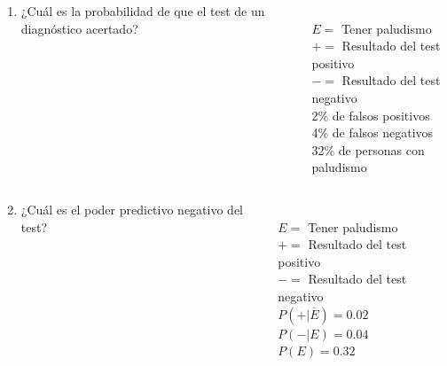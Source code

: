 \documentclass[aspectratio=149,10pt,xcolor=dvipsnames,t]{beamer}
\begin{document}
\begin{frame}
\begin{columns}
\begin{column}[T]{0.6\textwidth}
\begin{enumerate}
\item ¿Cuál es la probabilidad de que el test de un diagnóstico acertado?
\end{enumerate}
\end{column}
\begin{column}[T]{0.4\textwidth}
\\
$E=$ Tener paludismo\\
$+=$ Resultado del test positivo\\
$-=$ Resultado del test negativo\\
2\% de falsos positivos\\[7mm]
4\% de falsos negativos\\[7mm]
32\% de personas con paludismo
\end{column}
\end{columns}
\end{frame}


\begin{frame}
\begin{columns}
\begin{column}[T]{0.6\textwidth}
\begin{enumerate}
\setcounter{enumi}{1}
\item ¿Cuál es el poder predictivo negativo del test?
\end{enumerate}
\end{column}
\begin{column}[T]{0.4\textwidth}
\\
$E=$ Tener paludismo\\
$+=$ Resultado del test positivo\\
$-=$ Resultado del test negativo\\
$P(+|\overline{E})=0.02$\\
$P(-|E) = 0.04$\\
$P(E)=0.32$
\end{column}
\end{columns}
\end{frame}
\end{document}
